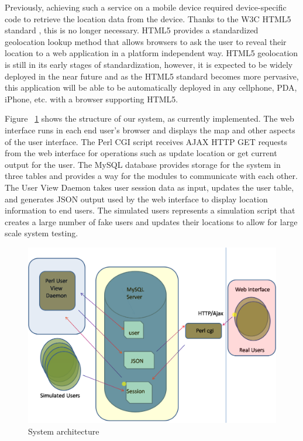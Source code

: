 \documentclass[11pt]{article}
\begin{document}
Previously, achieving such a service on a mobile device required
device-specific code to retrieve the location data from the device. Thanks
to the W3C HTML5 standard \cite{html5}, this is no longer necessary. HTML5
provides a standardized geolocation lookup method that allows browsers
to ask the user to reveal their location to a web application in a
platform independent way. HTML5 geolocation is still in its early stages
of standardization, however, it is expected to be widely deployed in
the near future and as the HTML5 standard becomes more pervasive, this
application will be able to be automatically deployed in any cellphone,
PDA, iPhone, etc. with a  browser supporting HTML5.

Figure ~\ref{fig:arch} shows the structure of our system, as currently implemented. 
The web interface runs in each end user's browser and displays the map
and other aspects of the user interface. The Perl CGI script receives AJAX
HTTP GET requests from the web interface for operations such as update
location or get current output for the user. The MySQL database provides
storage for the system in three tables and provides a way for the modules
to communicate with each other. The User View Daemon takes user session data
as input, updates the user table, and generates JSON output used by the web interface
to display location information to end users. The simulated users represents 
a simulation script that creates a large number of fake users and updates their locations
to allow for large scale system testing.
 
\begin{figure}[h]
\begin{center}
  \includegraphics[scale=0.5]{sysarch.png}
\caption{System architecture}
\label{fig:arch} 
\end{center}
\end{figure}
\end{document}
